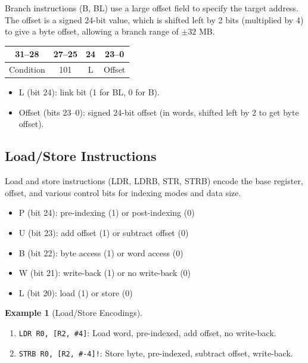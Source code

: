 \documentclass[11pt, a4paper, notitlepage]{report}
\theoremstyle{definition}
\theoremstyle{remark}
\theoremstyle{definition}
\newtheorem{example}[theorem]{Example}
\begin{document}
Branch instructions (B, BL) use a large offset field to specify the target address. The offset is a signed 24-bit value, which is shifted left by 2 bits (multiplied by 4) to give a byte offset, allowing a branch range of $\pm 32$ MB\@.

\begin{center}
\begin{tabular}{|c|c|c|c|}
\hline
31--28 & 27--25 & 24 & 23--0 \\
\hline
Condition & 101 & L & Offset \\
\hline
\end{tabular}
\end{center}

\begin{itemize}
  \item L (bit 24): link bit (1 for BL, 0 for B).
  \item Offset (bits 23--0): signed 24-bit offset (in words, shifted left by 2 to get byte offset).
\end{itemize}

\subsection{Load/Store Instructions}

Load and store instructions (LDR, LDRB, STR, STRB) encode the base register, offset, and various control bits for indexing modes and data size.

\begin{itemize}
  \item P (bit 24): pre-indexing (1) or post-indexing (0)
  \item U (bit 23): add offset (1) or subtract offset (0)
  \item B (bit 22): byte access (1) or word access (0)
  \item W (bit 21): write-back (1) or no write-back (0)
  \item L (bit 20): load (1) or store (0)
\end{itemize}

\begin{example}[Load/Store Encodings]
\leavevmode
\begin{enumerate}
  \item \texttt{LDR R0, [R2, \#4]}: Load word, pre-indexed, add offset, no write-back.
  \item \texttt{STRB R0, [R2, \#-4]!}: Store byte, pre-indexed, subtract offset, write-back.
\end{enumerate}
\end{example}
\end{document}
